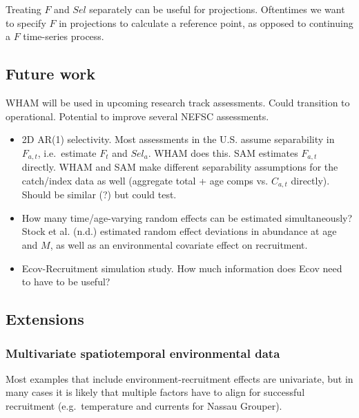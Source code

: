 \documentclass[]{article}
\providecommand{\tightlist}{%
  \setlength{\itemsep}{0pt}\setlength{\parskip}{0pt}}
\begin{document}
Treating \(F\) and \(Sel\) separately can be useful for projections.
Oftentimes we want to specify \(F\) in projections to calculate a
reference point, as opposed to continuing a \(F\) time-series process.

\hypertarget{future-work}{%
\subsection{Future work}\label{future-work}}

WHAM will be used in upcoming research track assessments. Could
transition to operational. Potential to improve several NEFSC
assessments.

\begin{itemize}
\tightlist
\item
  2D AR(1) selectivity. Most assessments in the U.S. assume separability
  in \(F_{a,t}\), i.e.~estimate \(F_t\) and \(Sel_a\). WHAM does this.
  SAM estimates \(F_{a,t}\) directly. WHAM and SAM make different
  separability assumptions for the catch/index data as well (aggregate
  total + age comps vs. \(C_{a,t}\) directly). Should be similar (?) but
  could test.
\item
  How many time/age-varying random effects can be estimated
  simultaneously? Stock et al. (n.d.) estimated random effect deviations
  in abundance at age and \(M\), as well as an environmental covariate
  effect on recruitment.
\item
  Ecov-Recruitment simulation study. How much information does Ecov need
  to have to be useful?
\end{itemize}

\hypertarget{extensions}{%
\subsection{Extensions}\label{extensions}}

\hypertarget{multivariate-spatiotemporal-environmental-data}{%
\subsubsection{Multivariate spatiotemporal environmental
data}\label{multivariate-spatiotemporal-environmental-data}}

Most examples that include environment-recruitment effects are
univariate, but in many cases it is likely that multiple factors have to
align for successful recruitment (e.g.~temperature and currents for
Nassau Grouper).
\end{document}

